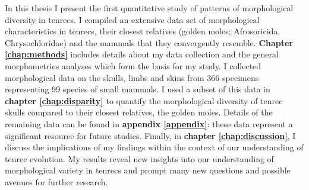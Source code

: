 
	In this thesis I present the first quantitative study of patterns of morphological diversity in tenrecs. I compiled an extensive data set of morphological characteristics in tenrecs, their closest relatives (golden moles; Afrosoricida, Chrysochloridae) and the mammals that they convergently resemble. \textbf{Chapter \ref{chap:methods}} includes details about my data collection and the general morphometrics analyses which form the basis for my study. I collected morphological data on the skulls, limbs and skins from 366 specimens representing 99 species of small mammals. I used a subset of this data in \textbf{chapter \ref{chap:disparity}} to quantify the morphological diversity of tenrec skulls compared to their closest relatives, the golden moles. Details of the remaining data can be found in \textbf{appendix \ref{appendix}}: these data represent a significant resource for future studies. Finally, in \textbf{chapter \ref{chap:discussion}}, I discuss the implications of my findings within the context of our understanding of tenrec evolution. %
 	My results reveal new insights into our understanding of morphological variety in tenrecs and prompt many new questions and possible avenues for further research.


